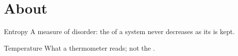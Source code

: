\flmHeading[toc=true]
\section{About }{\flmLabels{}}

\begin{defterm}{Entropy}\ignorespaces
A measure of disorder: the  of a system never decreases as its
 is kept.
\end{defterm}

\begin{defterm}{Temperature}\ignorespaces
What a thermometer reads; not the .
\end{defterm}

